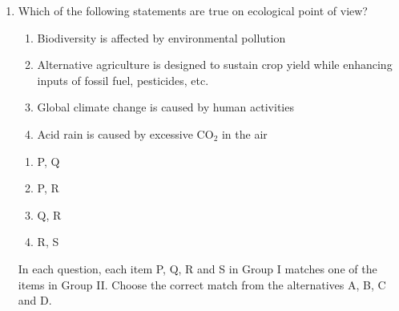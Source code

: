 \documentclass[journal,12pt,onecolumn]{IEEEtran}
\begin{document}
\begin{enumerate}
\begin{multicols}{2}
\begin{enumerate}[label=(\Alph*)]
\item P, S
\item R, S
\item Q, R
\item P, Q
\end{enumerate}
\end{multicols}
\item Which of the following statements are true on ecological point of view?
    \begin{enumerate}[label=\Alph*:,start=16]
        \item Biodiversity is affected by environmental pollution
        \item Alternative agriculture is designed to sustain crop yield while enhancing inputs of fossil fuel, pesticides, etc.
        \item Global climate change is caused by human activities
        \item Acid rain is caused by excessive CO$_2$ in the air
    \end{enumerate}
    \begin{multicols}{2}
    \begin{enumerate}[label=(\Alph*)]
    \item P, Q
    \item P, R
    \item Q, R
    \item R, S
\end{enumerate}
 \end{multicols}

 In each question, each item P, Q, R and S in Group I matches one of the items in Group II. 
Choose the correct match from the alternatives A, B, C and D.


\end{enumerate}
\end{document}
